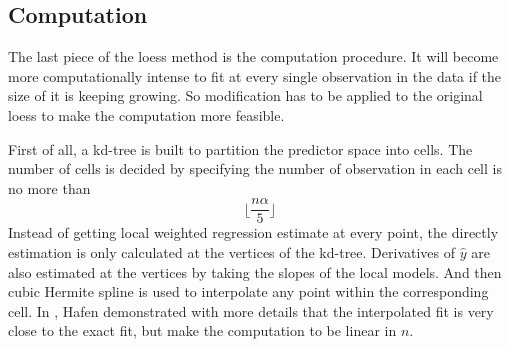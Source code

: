 \subsection{Computation}

The last piece of the loess method is the computation procedure. It will become
more computationally intense to fit at every single observation in the data if 
the size of it is keeping growing. So modification has to be applied to the 
original loess to make the computation more feasible. 

First of all, a kd-tree \cite{friedman1977algorithm} is built to partition the 
predictor space into cells. The number of cells is decided by specifying the 
number of observation in each cell is no more than 
\begin{equation} 
\lfloor\frac{n\alpha}{5}\rfloor
\end{equation} 
Instead of getting local weighted regression estimate at every point,
the directly estimation is only calculated at the vertices of the kd-tree. 
Derivatives of $\hat y$ are also estimated at the vertices by taking the slopes 
of the local models. And then cubic Hermite spline is used to interpolate any 
point within the corresponding cell.
In \cite{hafen2010local}, Hafen demonstrated with more details that the 
interpolated fit is very close to the exact fit, but make the computation to be 
linear in $n$.
